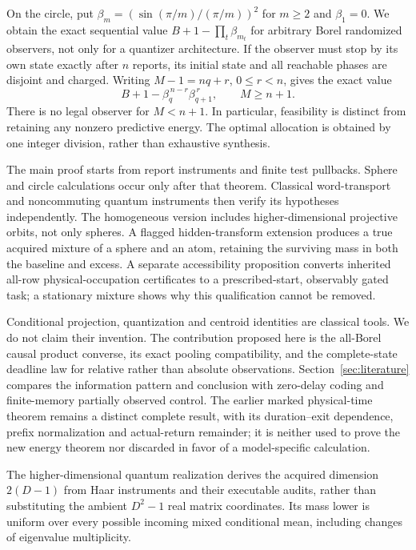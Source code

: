 On the circle, put $\beta_m=(\sin(\pi/m)/(\pi/m))^2$ for $m\ge2$ and $\beta_1=0$. We obtain the exact sequential value $B+1-\prod_t\beta_{m_t}$ for arbitrary Borel randomized observers, not only for a quantizer architecture. If the observer must stop by its own state exactly after $n$ reports, its initial state and all reachable phases are disjoint and charged. Writing $M-1=nq+r$, $0\le r<n$, gives the exact value
\[
 B+1-\beta_q^{\,n-r}\beta_{q+1}^{\,r},\qquad M\ge n+1.
\]
There is no legal observer for $M<n+1$. In particular, feasibility is distinct from retaining any nonzero predictive energy. The optimal allocation is obtained by one integer division, rather than exhaustive synthesis.

The main proof starts from report instruments and finite test pullbacks. Sphere and circle calculations occur only after that theorem. Classical word-transport and noncommuting quantum instruments then verify its hypotheses independently. The homogeneous version includes higher-dimensional projective orbits, not only spheres. A flagged hidden-transform extension produces a true acquired mixture of a sphere and an atom, retaining the surviving mass in both the baseline and excess. A separate accessibility proposition converts inherited all-row physical-occupation certificates to a prescribed-start, observably gated task; a stationary mixture shows why this qualification cannot be removed.

Conditional projection, quantization and centroid identities are classical tools. We do not claim their invention. The contribution proposed here is the all-Borel causal product converse, its exact pooling compatibility, and the complete-state deadline law for relative rather than absolute observations. Section~\ref{sec:literature} compares the information pattern and conclusion with zero-delay coding and finite-memory partially observed control. The earlier marked physical-time theorem remains a distinct complete result, with its duration--exit dependence, prefix normalization and actual-return remainder; it is neither used to prove the new energy theorem nor discarded in favor of a model-specific calculation.

The higher-dimensional quantum realization derives the acquired dimension $2(D-1)$ from Haar instruments and their executable audits, rather than substituting the ambient $D^2-1$ real matrix coordinates. Its mass lower is uniform over every possible incoming mixed conditional mean, including changes of eigenvalue multiplicity.
